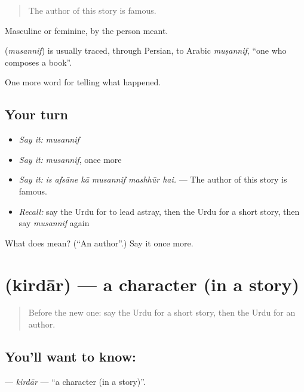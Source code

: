 \begin{quote}
The author of this story is famous.
\end{quote}

Masculine or feminine, by the person meant.

\begin{cousinweb}
\textbf{} (\emph{musannif}) is usually traced, through Persian, to Arabic \emph{muṣannif}, \textquotedblleft{}one who composes a book\textquotedblright{}.
\end{cousinweb}

\begin{grammarlens}[title={What you've built}]
One more word for telling what happened.
\end{grammarlens}

\subsection*{Your turn}
\begin{itemize}
\raggedright
  \item \emph{Say it:} \emph{musannif}
  \item \emph{Say it:} \emph{musannif}, once more
  \item \emph{Say it:} \emph{is afsāne kā musannif mashhūr hai.} — The author of this story is famous.
  \item \emph{Recall:} say the Urdu for to lead astray, then the Urdu for a short story, then say \emph{musannif} again
\end{itemize}

\begin{tcolorbox}[breakable,colback=teal!4,colframe=teal!35!black,title={Before you move on}]
What does  mean? (\textquotedblleft{}An author\textquotedblright{}.) Say it once more.
\end{tcolorbox}
\section[\texorpdfstring{\ur{کردار} (kirdār)}{کردار (kirdār)}]{ (kirdār) — a character (in a story)}

\label{lesson:UR-C329-kirdar}



\begin{quote}
Before the new one: say the Urdu for a short story, then the Urdu for an author.
\end{quote}

\subsection*{You'll want to know: }
\textbf{} — \emph{kirdār} — \textquotedblleft{}a character (in a story)\textquotedblright{}.

